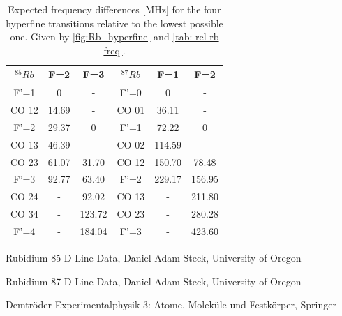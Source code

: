 \documentclass[]{article}
\begin{document}
\begin{table}[H]
\centering
\begin{tabular}{c|c|c| |c|c|c}
$^{85}Rb$ & F=2 & F=3 & $^{87}Rb$ & F=1 & F=2 \\ \hline\hline
F'=1 & 0    & -     & F'=0 & 0     & - \\
CO 12& 14.69& -     & CO 01& 36.11 & - \\
F'=2 & 29.37& 0     & F'=1 & 72.22 & 0 \\
CO 13& 46.39& -     & CO 02& 114.59& - \\
CO 23& 61.07& 31.70 & CO 12& 150.70& 78.48 \\
F'=3 & 92.77& 63.40 & F'=2 & 229.17& 156.95 \\
CO 24& -    & 92.02 & CO 13& -     & 211.80 \\
CO 34& -    & 123.72& CO 23& -     & 280.28 \\
F'=4 & -    & 184.04& F'=3 & -     & 423.60 \\
\end{tabular}
\caption{Expected frequency differences [MHz] for the four hyperfine transitions relative to the lowest possible one. Given by \autoref{fig:Rb_hyperfine} and \autoref{tab: rel rb freq}.}
\label{tab: rel rb freq}
\end{table}


\newpage
\begin{thebibliography}{}
 Rubidium 85 D Line Data, Daniel Adam Steck, University of Oregon

 Rubidium 87 D Line Data, Daniel Adam Steck, University of Oregon

 Demtröder Experimentalphysik 3: Atome, Moleküle und Festkörper, Springer


\end{thebibliography}
\end{document}
